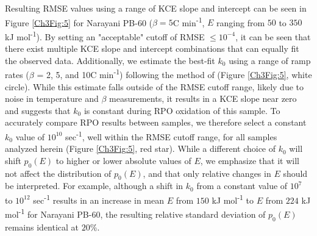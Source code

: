 Resulting RMSE values using a range of KCE slope and intercept can be seen in Figure \ref{Ch3Fig:5} for Narayani PB-60 ($\beta = 5$\textdegree C min\textsuperscript{-1}, $E$ ranging from $50$ to $350$ kJ mol\textsuperscript{-1}). By setting an "acceptable" cutoff of RMSE $\leq 10^{-4}$, it can be seen that there exist multiple KCE slope and intercept combinations that can equally fit the observed data. Additionally, we estimate the best-fit $k_{0}$ using a range of ramp rates ($\beta$ = 2, 5, and 10\textdegree C min\textsuperscript{-1}) following the method of \citet{Miura:1998jf} (Figure \ref{Ch3Fig:5}, white circle). While this estimate falls outside of the RMSE cutoff range, likely due to noise in temperature and $\beta$ measurements, it results in a KCE slope near zero and suggests that $k_{0}$ is constant during RPO oxidation of this sample. To accurately compare RPO results between samples, we therefore select a constant $k_{0}$ value of $10^{10}$ sec\textsuperscript{-1}, well within the RMSE cutoff range, for all samples analyzed herein (Figure \ref{Ch3Fig:5}, red star). While a different choice of $k_{0}$ will shift $p_{0}(E)$ to higher or lower absolute values of $E$, we emphasize that it will not affect the distribution of $p_{0}(E)$, and that only relative changes in $E$ should be interpreted. For example, although a shift in $k_{0}$ from a constant value of $10^{7}$ to $10^{12}$ sec\textsuperscript{-1} results in an increase in mean $E$ from $150$ kJ mol\textsuperscript{-1} to $E$ from $224$ kJ mol\textsuperscript{-1} for Narayani PB-60, the resulting relative standard deviation of $p_{0}(E)$ remains identical at $20$\%.
 
